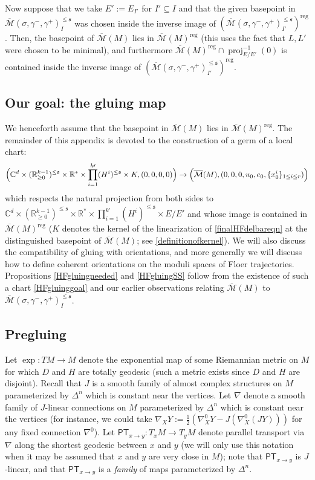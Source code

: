 \documentclass[12pt]{article}
\theoremstyle{definition}
\theoremstyle{remark}
\numberwithin{equation}{subsection}
\newcommand{\s}{\mathfrak s}
\newcommand{\CC}{\mathbb C}
\newcommand{\RR}{\mathbb R}
\newcommand{\PT}{\mathsf{PT}}
\newcommand{\proj}{\operatorname{proj}}
\newcommand{\Mbar}{\overline{\mathcal M}}
\newcommand{\reg}{\mathrm{reg}}
\begin{document}
Now suppose that we take $E':=E_{I'}$ for $I'\subseteq I$ and that the given basepoint in $\Mbar(\sigma,\gamma^-,\gamma^+)_I^{\leq\s}$ was chosen inside the inverse image of $(\Mbar(\sigma,\gamma^-,\gamma^+)_{I'}^{\leq\s})^\reg$.  Then, the basepoint of $\Mbar(M)$ lies in $\Mbar(M)^\reg$ (this uses the fact that $L,L'$ were chosen to be minimal), and furthermore $\Mbar(M)^\reg\cap\proj_{E/E'}^{-1}(0)$ is contained inside the inverse image of $(\Mbar(\sigma,\gamma^-,\gamma^+)_{I'}^{\leq\s})^\reg$.

\subsection{Our goal: the gluing map}

We henceforth assume that the basepoint in $\Mbar(M)$ lies in $\Mbar(M)^\reg$.  The remainder of this appendix is devoted to the construction of a germ of a local chart:
\begin{equation}\label{HFgluinggoal}
\Bigl(\CC^d\times(\RR_{\geq 0}^{k-1})^{\leq\s}\times\RR^\ast\times\prod_{i=1}^{k\prime}(H^i)^{\leq\s}\times K,(0,0,0,0)\Bigr)\to\Bigl(\Mbar(M),(0,0,0,u_0,e_0,\{x_0^i\}_{1\leq i\leq r})\Bigr)
\end{equation}
which respects the natural projection from both sides to $\CC^d\times(\RR_{\geq 0}^{k-1})^{\leq\s}\times\RR^\ast\times\prod_{i=1}^{k\prime}(H^i)^{\leq\s}\times E/E'$ and whose image is contained in $\Mbar(M)^\reg$ ($K$ denotes the kernel of the linearization of \eqref{finalHFdelbareqn} at the distinguished basepoint of $\Mbar(M)$; see \eqref{definitionofkernel}).  We will also discuss the compatibility of gluing with orientations, and more generally we will discuss how to define coherent orientations on the moduli spaces of Floer trajectories.  Propositions \ref{HFgluingneeded} and \ref{HFgluingSS} follow from the existence of such a chart \eqref{HFgluinggoal} and our earlier observations relating $\Mbar(M)$ to $\Mbar(\sigma,\gamma^-,\gamma^+)_I^{\leq\s}$.

\subsection{Pregluing}

Let $\exp:TM\to M$ denote the exponential map of some Riemannian metric on $M$ for which $D$ and $H$ are totally geodesic (such a metric exists since $D$ and $H$ are disjoint).  Recall that $J$ is a smooth family of almost complex structures on $M$ parameterized by $\Delta^n$ which is constant near the vertices.  Let $\nabla$ denote a smooth family of $J$-linear connections on $M$ parameterized by $\Delta^n$ which is constant near the vertices (for instance, we could take $\nabla_XY:=\frac 12(\nabla^0_XY-J(\nabla^0_X(JY)))$ for any fixed connection $\nabla^0$).  Let $\PT_{x\to y}:T_xM\to T_yM$ denote parallel transport via $\nabla$ along the shortest geodesic between $x$ and $y$ (we will only use this notation when it may be assumed that $x$ and $y$ are very close in $M$); note that $\PT_{x\to y}$ is $J$-linear, and that $\PT_{x\to y}$ is a \emph{family} of maps parameterized by $\Delta^n$.
\end{document}
